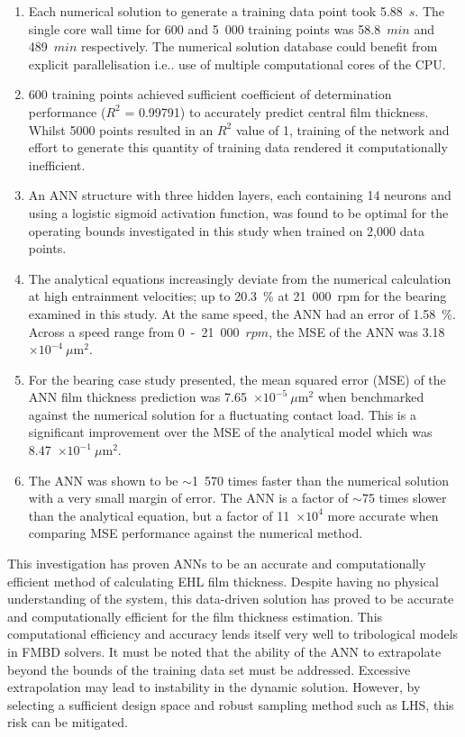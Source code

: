\begin{enumerate}
	\item Each numerical solution to generate a training data point took 5.88~$s$. The single core wall time for 600 and 5~000 training points was 58.8~$min$ and 489~$min$ respectively. The numerical solution database could benefit from explicit parallelisation i.e.. use of multiple computational cores of the CPU. 
	\item 600 training points achieved sufficient coefficient of determination performance ($R^2$ = 0.99791) to accurately predict central film thickness. Whilst 5000 points resulted in an $R^2$ value of 1, training of the network and effort to generate this quantity of training data rendered it computationally inefficient.
	\item An ANN structure with three hidden layers, each containing 14 neurons and using a logistic sigmoid activation function, was found to be optimal for the operating bounds investigated in this study when trained on 2,000 data points.
	\item The analytical equations increasingly deviate from the numerical calculation at high entrainment velocities; up to 20.3~\% at 21~000~rpm for the bearing examined in this study. At the same speed, the ANN had an error of 1.58~\%. Across a speed range from 0~-~21~000~$rpm$, the MSE of the ANN was 3.18~$\times 10^{-4}~\mu \mathrm{m}^2$.
	\item For the bearing case study presented, the mean squared error (MSE) of the ANN film thickness prediction was 7.65~$\times 10^{-5}~\mu \mathrm{m}^2$ when benchmarked against the numerical solution for a fluctuating contact load. This is a significant improvement over the MSE of the analytical model which was 8.47~$\times 10^{-1}~\mu\mathrm{m}^2$.
	\item The ANN was shown to be $\sim$1~570 times faster than the numerical solution with a very small margin of error. The ANN is a factor of $\sim$75 times slower than the analytical equation, but a factor of 11~$\times 10^{4}$ more accurate when comparing MSE performance against the numerical method.
\end{enumerate}

This investigation has proven ANNs to be an accurate and computationally efficient method of calculating EHL film thickness. Despite having no physical understanding of the system, this data-driven solution has proved to be accurate and computationally efficient for the film thickness estimation. This computational efficiency and accuracy lends itself very well to tribological models in FMBD solvers. It must be noted that the ability of the ANN to extrapolate beyond the bounds of the training data set must be addressed. Excessive extrapolation may lead to instability in the dynamic solution. However, by selecting a sufficient design space and robust sampling method such as LHS, this risk can be mitigated.

